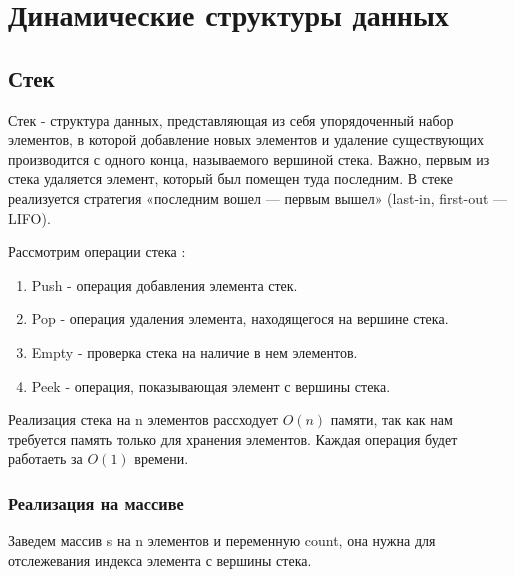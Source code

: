\section{Динамические структуры данных}

\subsection{Стек}

\begin{definicion}
	Стек - структура данных, представляющая из себя упорядоченный набор элементов, в которой добавление новых элементов и удаление существующих производится с одного конца, называемого вершиной стека. Важно, первым из стека удаляется элемент, который был помещен туда последним. В стеке реализуется стратегия «последним вошел — первым вышел» (last-in, first-out — LIFO).
\end{definicion}

	Рассмотрим операции стека :
\begin{enumerate}
	\item \begin{definicion}
			  Push - операция добавления элемента стек.
	      \end{definicion}
	\item \begin{definicion}
			  Pop - операция удаления элемента, находящегося на вершине стека.
		  \end{definicion}
	\item \begin{definicion}
			  Empty - проверка стека на наличие в нем элементов.
		  \end{definicion}
	\item \begin{definicion}
			  Peek - операция, показывающая элемент с вершины стека.
	      \end{definicion}
\end{enumerate}
Реализация стека на n элементов рассходует $O(n)$ памяти, так как нам требуется память только для хранения элементов. Каждая операция будет работаеть за $O(1)$ времени.


\subsubsection{Реализация на массиве}
Заведем массив s на n элементов и переменную count, она нужна для отслежевания индекса элемента с вершины стека.\\

